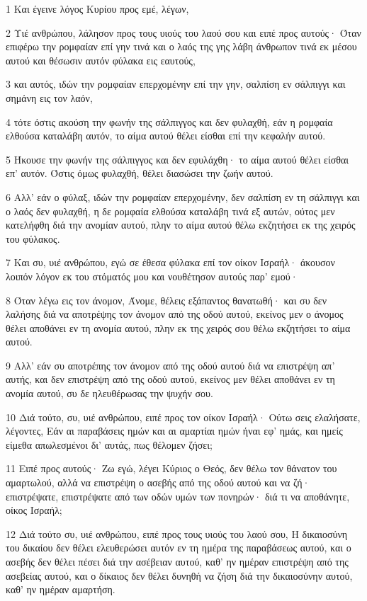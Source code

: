 \par 1 Και έγεινε λόγος Κυρίου προς εμέ, λέγων,
\par 2 Υιέ ανθρώπου, λάλησον προς τους υιούς του λαού σου και ειπέ προς αυτούς· Όταν επιφέρω την ρομφαίαν επί γην τινά και ο λαός της γης λάβη άνθρωπον τινά εκ μέσου αυτού και θέσωσιν αυτόν φύλακα εις εαυτούς,
\par 3 και αυτός, ιδών την ρομφαίαν επερχομένην επί την γην, σαλπίση εν σάλπιγγι και σημάνη εις τον λαόν,
\par 4 τότε όστις ακούση την φωνήν της σάλπιγγος και δεν φυλαχθή, εάν η ρομφαία ελθούσα καταλάβη αυτόν, το αίμα αυτού θέλει είσθαι επί την κεφαλήν αυτού.
\par 5 Ήκουσε την φωνήν της σάλπιγγος και δεν εφυλάχθη· το αίμα αυτού θέλει είσθαι επ' αυτόν. Όστις όμως φυλαχθή, θέλει διασώσει την ζωήν αυτού.
\par 6 Αλλ' εάν ο φύλαξ, ιδών την ρομφαίαν επερχομένην, δεν σαλπίση εν τη σάλπιγγι και ο λαός δεν φυλαχθή, η δε ρομφαία ελθούσα καταλάβη τινά εξ αυτών, ούτος μεν κατελήφθη διά την ανομίαν αυτού, πλην το αίμα αυτού θέλω εκζητήσει εκ της χειρός του φύλακος.
\par 7 Και συ, υιέ ανθρώπου, εγώ σε έθεσα φύλακα επί τον οίκον Ισραήλ· άκουσον λοιπόν λόγον εκ του στόματός μου και νουθέτησον αυτούς παρ' εμού·
\par 8 Όταν λέγω εις τον άνομον, Άνομε, θέλεις εξάπαντος θανατωθή· και συ δεν λαλήσης διά να αποτρέψης τον άνομον από της οδού αυτού, εκείνος μεν ο άνομος θέλει αποθάνει εν τη ανομία αυτού, πλην εκ της χειρός σου θέλω εκζητήσει το αίμα αυτού.
\par 9 Αλλ' εάν συ αποτρέπης τον άνομον από της οδού αυτού διά να επιστρέψη απ' αυτής, και δεν επιστρέψη από της οδού αυτού, εκείνος μεν θέλει αποθάνει εν τη ανομία αυτού, συ δε ηλευθέρωσας την ψυχήν σου.
\par 10 Διά τούτο, συ, υιέ ανθρώπου, ειπέ προς τον οίκον Ισραήλ· Ούτω σεις ελαλήσατε, λέγοντες, Εάν αι παραβάσεις ημών και αι αμαρτίαι ημών ήναι εφ' ημάς, και ημείς είμεθα απωλεσμένοι δι' αυτάς, πως θέλομεν ζήσει;
\par 11 Ειπέ προς αυτούς· Ζω εγώ, λέγει Κύριος ο Θεός, δεν θέλω τον θάνατον του αμαρτωλού, αλλά να επιστρέψη ο ασεβής από της οδού αυτού και να ζή· επιστρέψατε, επιστρέψατε από των οδών υμών των πονηρών· διά τι να αποθάνητε, οίκος Ισραήλ;
\par 12 Διά τούτο συ, υιέ ανθρώπου, ειπέ προς τους υιούς του λαού σου, Η δικαιοσύνη του δικαίου δεν θέλει ελευθερώσει αυτόν εν τη ημέρα της παραβάσεως αυτού, και ο ασεβής δεν θέλει πέσει διά την ασέβειαν αυτού, καθ' ην ημέραν επιστρέψη από της ασεβείας αυτού, και ο δίκαιος δεν θέλει δυνηθή να ζήση διά την δικαιοσύνην αυτού, καθ' ην ημέραν αμαρτήση.
